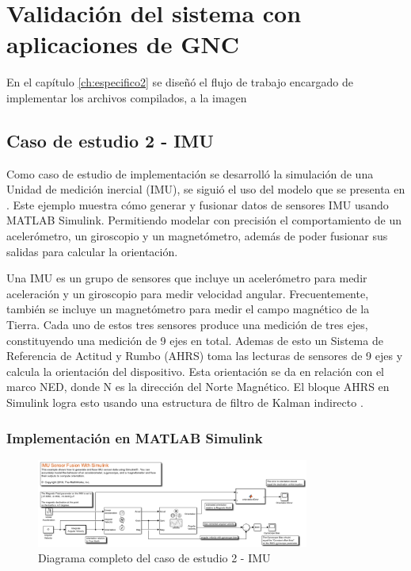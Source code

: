 \chapter{Validación del sistema con aplicaciones de GNC}
\label{ch:especifico3}

En el capítulo \ref{ch:especifico2} se diseñó el flujo de trabajo encargado de implementar los archivos compilados, a la imagen 

\section{Caso de estudio 2 - IMU}

Como caso de estudio de implementación se desarrolló la simulación de una Unidad de medición inercial (IMU), se siguió el uso del modelo que se presenta en \cite{mathworks2024imu}. Este ejemplo muestra cómo generar y fusionar datos de sensores IMU usando MATLAB Simulink. Permitiendo modelar con precisión el comportamiento de un acelerómetro, un giroscopio y un magnetómetro, además de poder fusionar sus salidas para calcular la orientación.

Una IMU es un grupo de sensores que incluye un acelerómetro para medir aceleración y un giroscopio para medir velocidad angular. Frecuentemente, también se incluye un magnetómetro para medir el campo magnético de la Tierra. Cada uno de estos tres sensores produce una medición de tres ejes, constituyendo una medición de 9 ejes en total. Ademas de esto un Sistema de Referencia de Actitud y Rumbo (AHRS) toma las lecturas de sensores de 9 ejes y calcula la orientación del dispositivo. Esta orientación se da en relación con el marco NED, donde N es la dirección del Norte Magnético. El bloque AHRS en Simulink logra esto usando una estructura de filtro de Kalman indirecto \cite{mathworks2024imu}.

\newpage
\subsection{Implementación en MATLAB Simulink}

\begin{figure}[h!]
    \centering
    \includegraphics[width=0.8\textwidth]{fig/Capitulo5/Caso_de_estudio_IMU/FULL_IMU.pdf}
    \caption{Diagrama completo del caso de estudio 2 - IMU \cite{mathworks2024imu}}
    \label{fig:caso_de_estudio_2_IMU}
\end{figure}


